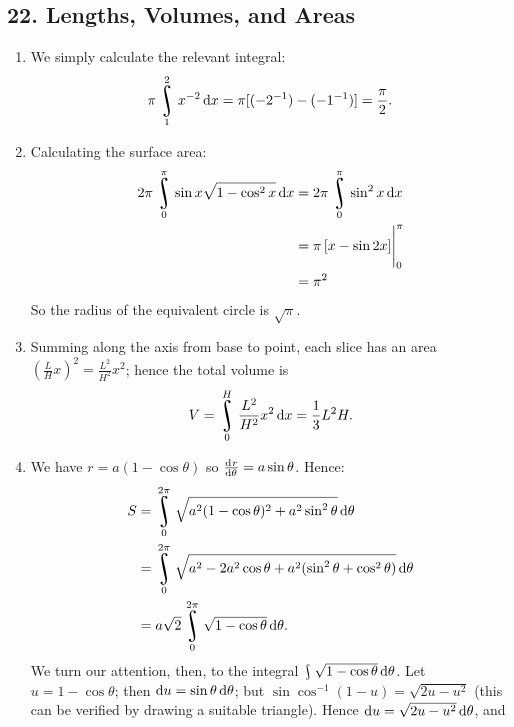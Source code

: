 \subsection*{22. Lengths, Volumes, and Areas}
\begin{enumerate}
  \item We simply calculate the relevant integral:
        \begin{displaymath}
          \pi \rint_1^2 x^{-2} \dif{x} = \pi [(-2^{-1}) - (-1^{-1})] = \frac{\pi}{2}.
        \end{displaymath}
  \item Calculating the surface area:
        \begin{align*}
          2\pi \rint_0^\pi \sin x \sqrt{1 - \cos^2 x} \dif{x} &= 2\pi \rint_0^\pi \sin^2 x \dif{x}\\
                                                              &= \pi \eval{\left[ x - \sin 2x \right]}_0^\pi\\
                                                              &= \pi^2
        \end{align*}
        So the radius of the equivalent circle is $ \sqrt{\pi} $.
  \item Summing along the axis from base to point, each slice has an area $ \left(\frac{L}{H}{x}\right)^2 = \frac{L^2}{H^2}x^2 $;
        hence the total volume is
        \begin{displaymath}
          V = \rint_0^H \frac{L^2}{H^2}x^2 \dif{x} = \frac{1}{3} L^2 H.
        \end{displaymath}
  \item We have $ r = a(1 - \cos \theta) $ so $ \od{r}{\theta} = a\sin \theta $. Hence:
        \begin{align*}
          S &= \rint^{2\pi}_0 \sqrt{a^2(1-\cos\theta)^2 + a^2\sin^2 \theta} \dif{\theta}\\
            &= \rint^{2\pi}_0 \sqrt{a^2 - 2a^2 \cos \theta + a^2(\sin^2 \theta + \cos^2 \theta)} \dif{\theta}\\
            &= a\sqrt{2} \rint^{2\pi}_0 \sqrt{1-\cos\theta} \dif{\theta}.
        \end{align*}
        We turn our attention, then, to the integral $ \rint \sqrt{1-\cos \theta} \dif{\theta} $. Let $ u = 1 - \cos \theta $;
        then $ \dif{u} = \sin \theta \dif{\theta} $; but $ \sin \cos^{-1} (1 - u) = \sqrt{2u - u^2} $ (this can be verified by drawing
        a suitable triangle). Hence $ \dif{u} = \sqrt{2u - u^2} \dif{\theta} $, and
        \begin{align*}

\end{align*}
\end{enumerate}
